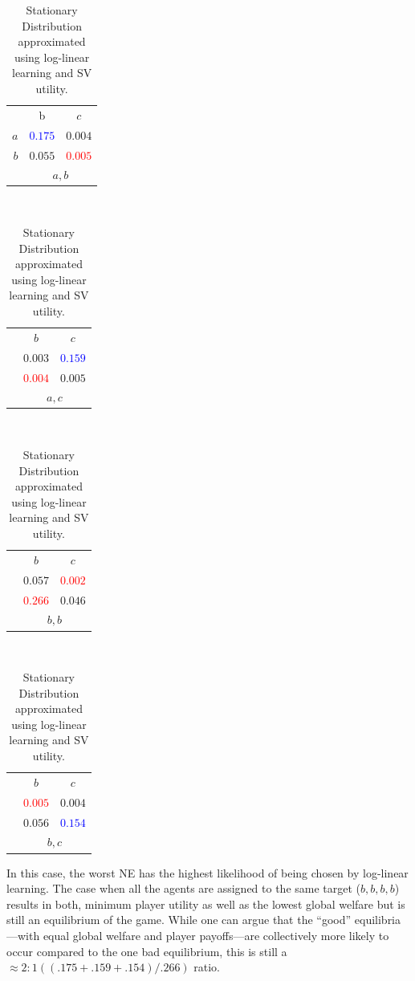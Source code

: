\documentclass[11pt, onecolumn, compsoc, letterpaper]{article}
\begin{document}
\begin{table}[!htb]
	\centering\begin{tabular}{r|c|c|}
	\multicolumn{1}{c}{}
	& \multicolumn{1}{c}{b}
	& \multicolumn{1}{c}{$c$}\\
	\cline{2-3}
	$a$ & \textcolor{blue}{$0.175$} & $0.004$\\
	\cline{2-3}
	$b$ & $0.055$ & \textcolor{red}{$0.005$}\\
	\cline{2-3}
	\multicolumn{1}{c}{}
	& \multicolumn{2}{c}{$a,b$}
	\end{tabular}~
	\centering\begin{tabular}{r|c|c|}
	\multicolumn{1}{c}{}
	& \multicolumn{1}{c}{$b$}
	& \multicolumn{1}{c}{$c$}\\
	\cline{2-3}
	& $0.003$ & \textcolor{blue}{$0.159$}\\
	\cline{2-3}
	& \textcolor{red}{$0.004$} & $0.005$\\
	\cline{2-3}
	\multicolumn{1}{c}{}
	& \multicolumn{2}{c}{$a,c$}
	\end{tabular}~
	\centering\begin{tabular}{r|c|c|}
	\multicolumn{1}{c}{}
	& \multicolumn{1}{c}{$b$}
	& \multicolumn{1}{c}{$c$}\\
	\cline{2-3}
	& $0.057$ & \textcolor{red}{$0.002$}\\
	\cline{2-3}
	& \textcolor{red}{$0.266$} & $0.046$\\
	\cline{2-3}
	\multicolumn{1}{c}{}
	& \multicolumn{2}{c}{$b,b$}
	\end{tabular}~
	\centering\begin{tabular}{r|c|c|}
	\multicolumn{1}{c}{}
	& \multicolumn{1}{c}{$b$}
	& \multicolumn{1}{c}{$c$}\\
	\cline{2-3}
	& \textcolor{red}{$0.005$} & $0.004$\\
	\cline{2-3}
	& $0.056$ & \textcolor{blue}{$0.154$}\\
	\cline{2-3}
	\multicolumn{1}{c}{}
	& \multicolumn{2}{c}{$b,c$}
	\end{tabular}
	\centering\caption{Stationary Distribution approximated using log-linear learning and SV utility.}\label{tab:svsd}
\end{table}

In this case, the worst NE has the highest likelihood of being chosen by log-linear learning. The case when all the agents are assigned to the same target ($b, b, b, b$) results in both, minimum player utility as well as the lowest global welfare but is still an equilibrium of the game. While one can argue that the ``good'' equilibria---with equal global welfare and player payoffs---are collectively more likely to occur compared to the one bad equilibrium, this is still a $\approx 2:1 ((.175 + .159 + .154) / .266)$ ratio.
\end{document}
